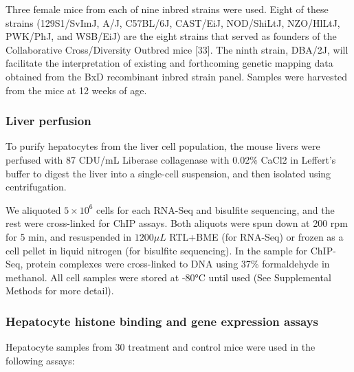 \documentclass[10pt,letterpaper]{article}
\begin{document}
Three female mice from each of nine inbred strains were used. Eight of
these strains (129S1/SvImJ, A/J, C57BL/6J, CAST/EiJ, NOD/ShiLtJ,
NZO/HlLtJ, PWK/PhJ, and WSB/EiJ) are the eight strains that served as
founders of the Collaborative Cross/Diversity Outbred mice {[}33{]}. The
ninth strain, DBA/2J, will facilitate the interpretation of existing and
forthcoming genetic mapping data obtained from the BxD recombinant
inbred strain panel. Samples were harvested from the mice at 12 weeks of
age.

\hypertarget{liver-perfusion}{%
\subsubsection{Liver perfusion}\label{liver-perfusion}}

To purify hepatocytes from the liver cell population, the mouse livers
were perfused with 87 CDU/mL Liberase collagenase with 0.02\% CaCl2 in
Leffert's buffer to digest the liver into a single-cell suspension, and
then isolated using centrifugation.

We aliquoted \(5 \times 10^{6}\) cells for each RNA-Seq and bisulfite
sequencing, and the rest were cross-linked for ChIP assays. Both
aliquots were spun down at 200 rpm for 5 min, and resuspended in
\(1200\mu L\) RTL+BME (for RNA-Seq) or frozen as a cell pellet in liquid
nitrogen (for bisulfite sequencing). In the sample for ChIP-Seq, protein
complexes were cross-linked to DNA using 37\% formaldehyde in methanol.
All cell samples were stored at -80°C until used (See Supplemental
Methods for more detail).

\hypertarget{hepatocyte-histone-binding-and-gene-expression-assays}{%
\subsubsection{Hepatocyte histone binding and gene expression
assays}\label{hepatocyte-histone-binding-and-gene-expression-assays}}

Hepatocyte samples from 30 treatment and control mice were used in the
following assays:
\end{document}
